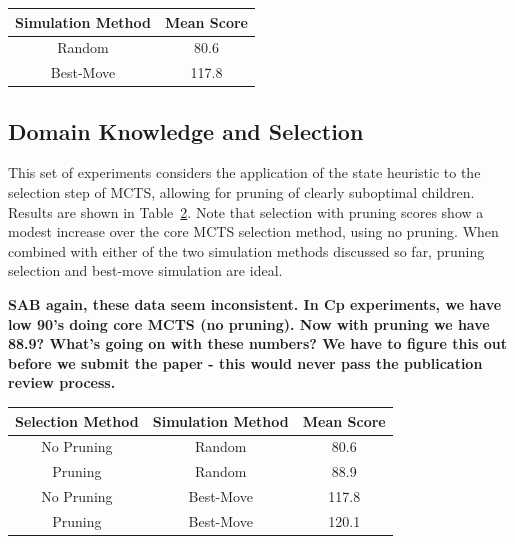 \documentclass[letterpaper]{article}
\begin{document}
\begin{table}
\label{tbl:Simulate}
\centering
\begin{tabular}{c c}
\hline
Simulation Method & Mean Score \\
\hline
Random & 80.6 \\
Best-Move & 117.8 \\
\hline
\end{tabular}
\end{table}

\subsection{Domain Knowledge and Selection}

%

This set of experiments considers the application of the state heuristic to the selection step of MCTS, allowing for pruning of clearly suboptimal children. Results are shown in Table~\ref{tbl:Selection}. Note that selection with pruning scores show a modest increase over the core MCTS selection method, using no pruning. When combined with either of the two simulation methods discussed so far, pruning selection and best-move simulation are ideal.

{\bf SAB again, these data seem inconsistent. In Cp experiments, we have low 90's doing core MCTS (no pruning). Now with pruning we have 88.9? What's going on with these numbers? We have to figure this out before we submit the paper - this would never pass the publication review process.}

\begin{table}
\label{tbl:Selection}
\centering
\begin{tabular}{c c c}
\hline
Selection Method & Simulation Method & Mean Score \\
\hline
No Pruning & Random & 80.6 \\
Pruning & Random & 88.9 \\
No Pruning & Best-Move & 117.8 \\
Pruning & Best-Move & 120.1 \\
\hline
\end{tabular}
\end{table}
\end{document}
